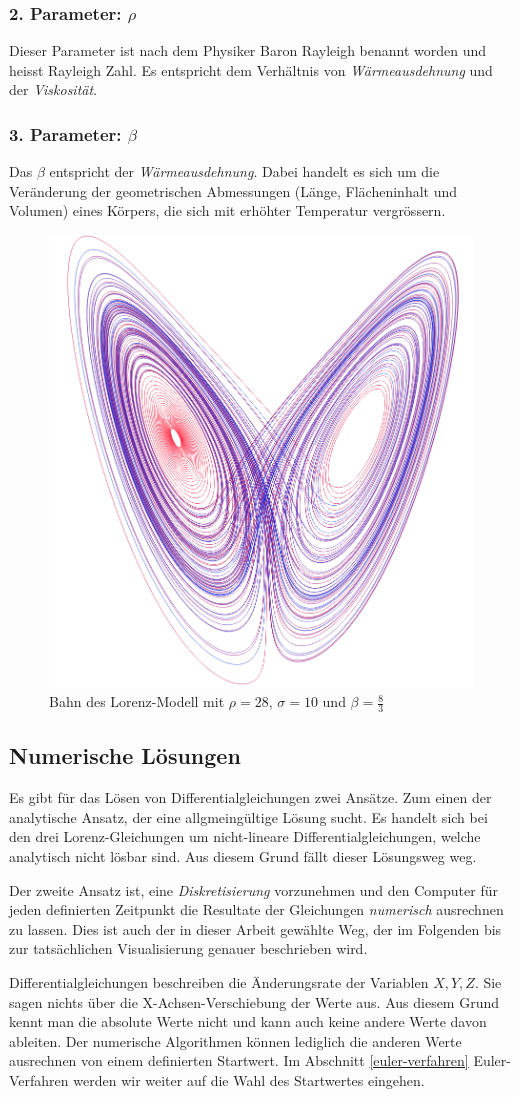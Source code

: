 \subsubsection{2. Parameter: $\rho$}
Dieser Parameter ist nach dem Physiker Baron Rayleigh benannt worden und heisst Rayleigh Zahl. Es entspricht dem Verhältnis von \textit{Wärmeausdehnung} und der \textit{Viskosität}.

\subsubsection{3. Parameter: $\beta$}
Das $ \beta $ entspricht der \textit{Wärmeausdehnung}. Dabei handelt es sich um die Veränderung der geometrischen Abmessungen (Länge, Flächeninhalt und Volumen) eines Körpers, die sich mit erhöhter Temperatur vergrössern.

\begin{figure}
	\centering
	\includegraphics[width=0.3\linewidth]{lorenz/assets/lorenz-modell/lorenz-modell}
	\caption{Bahn des Lorenz-Modell mit $\rho = 28$, $\sigma = 10$ und $\beta = \frac{8}{3}$}
	\label{fig:lorenz-modell}
\end{figure}


\subsection{Numerische Lösungen}
Es gibt für das Lösen von Differentialgleichungen zwei Ansätze. Zum einen der analytische Ansatz, der eine allgmeingültige Lösung sucht. Es handelt sich bei den drei Lorenz-Gleichungen um nicht-lineare Differentialgleichungen, welche analytisch nicht lösbar sind. Aus diesem Grund fällt dieser Lösungsweg weg. 

Der zweite Ansatz ist, eine \textit{Diskretisierung} vorzunehmen und den Computer für jeden definierten Zeitpunkt die Resultate der Gleichungen \textit{numerisch} ausrechnen zu lassen. Dies ist auch der in dieser Arbeit gewählte Weg, der im Folgenden bis zur tatsächlichen Visualisierung genauer beschrieben wird.

Differentialgleichungen beschreiben die Änderungsrate der Variablen $ X, Y, Z $. Sie sagen nichts über die X-Achsen-Verschiebung der Werte aus. Aus diesem Grund kennt man die absolute Werte nicht und kann auch keine andere Werte davon ableiten. Der numerische Algorithmen können lediglich die anderen Werte ausrechnen von einem definierten Startwert. Im Abschnitt \ref{euler-verfahren} Euler-Verfahren werden wir weiter auf die Wahl des Startwertes eingehen.

